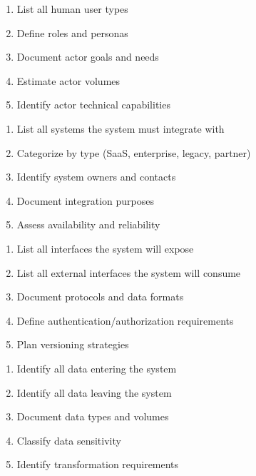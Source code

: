 \documentclass[11pt,letterpaper]{article}
\begin{document}
\begin{guidancebox}
\begin{enumerate}[nosep]
    \item List all human user types
    \item Define roles and personas
    \item Document actor goals and needs
    \item Estimate actor volumes
    \item Identify actor technical capabilities
\end{enumerate}
\end{guidancebox}

\begin{guidancebox}
\begin{enumerate}[nosep]
    \item List all systems the system must integrate with
    \item Categorize by type (SaaS, enterprise, legacy, partner)
    \item Identify system owners and contacts
    \item Document integration purposes
    \item Assess availability and reliability
\end{enumerate}
\end{guidancebox}

\begin{guidancebox}
\begin{enumerate}[nosep]
    \item List all interfaces the system will expose
    \item List all external interfaces the system will consume
    \item Document protocols and data formats
    \item Define authentication/authorization requirements
    \item Plan versioning strategies
\end{enumerate}
\end{guidancebox}

\begin{guidancebox}
\begin{enumerate}[nosep]
    \item Identify all data entering the system
    \item Identify all data leaving the system
    \item Document data types and volumes
    \item Classify data sensitivity
    \item Identify transformation requirements
\end{enumerate}
\end{guidancebox}
\end{document}
